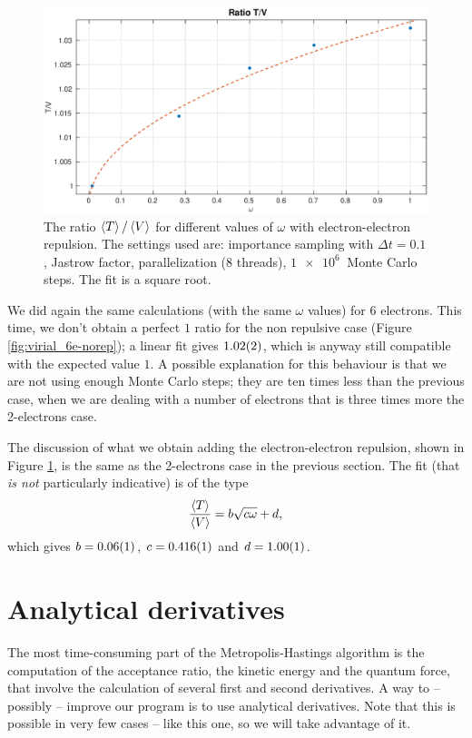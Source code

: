 \documentclass[a4paper,twoside,11pt]{book}
\begin{document}
\begin{figure}[H]
	\centering
	\includegraphics[width=\textwidth]{virial_6e-rep}
	\caption{The ratio $\Braket{T} / \Braket{V}$ for different values of $\omega$ with electron-electron repulsion. The settings used are: importance sampling with $\Delta t = 0.1$, Jastrow factor, parallelization (8 threads), $\SI{1e6}{}$ Monte Carlo steps. The fit is a square root.}
	\label{fig:virial_6e-rep}
\end{figure}

We did again the same calculations (with the same $\omega$ values) for $6$ electrons. This time, we don't obtain a perfect $1$ ratio for the non repulsive case (Figure \ref{fig:virial_6e-norep}); a linear fit gives $\SI{1.02 \pm 0.02}{}$, which is anyway still compatible with the expected value $1$. A possible explanation for this behaviour is that we are not using enough Monte Carlo steps; they are ten times less than the previous case, when we are dealing with a number of electrons that is three times more the 2-electrons case.

The discussion of what we obtain adding the electron-electron repulsion, shown in Figure \ref{fig:virial_6e-rep}, is the same as the 2-electrons case in the previous section. The fit (that \emph{is not} particularly indicative) is of the type
\begin{equation}
	\frac{\Braket{T}}{\Braket{V}} = b\sqrt{c\omega}+d,
\end{equation}
which gives $b = \SI{0.06 \pm 0.01}{}$, $c = \SI{0.416 \pm 0.001}{}$ and $d = \SI{1.00 \pm 0.01}{}$.


\chapter{Analytical derivatives}
The most time-consuming part of the Metropolis-Hastings algorithm is the computation of the acceptance ratio, the kinetic energy and the quantum force, that involve the calculation of several first and second derivatives. A way to -- possibly -- improve our program is to use analytical derivatives. Note that this is possible in very few cases -- like this one, so we will take advantage of it.
\end{document}

